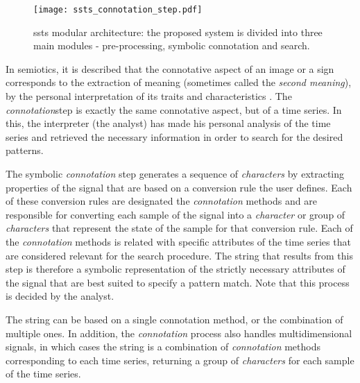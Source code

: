 \begin{figure}
\centering
\texttt{[image: ssts\_connotation\_step.pdf]}
\label{fig:ssts_connotation}
\caption{\gls{ssts} modular architecture: the proposed system is divided into three main modules - pre-processing, symbolic connotation and search.}
\end{figure}

In semiotics, it is described that the connotative aspect of an image or a sign corresponds to the extraction of meaning (sometimes called the \textit{second meaning}), by the personal interpretation of its traits and characteristics \cite{connotation}. The \textit{connotation}step is exactly the same connotative aspect, but of a time series. In this, the interpreter (the analyst) has made his personal analysis of the time series and retrieved the necessary information in order to search for the desired patterns. 
\par
The symbolic \textit{connotation} step generates a sequence of \textit{characters} by extracting properties of the signal that are based on a conversion rule the user defines. Each of these conversion rules are designated the \textit{connotation} methods and are responsible for converting each sample of the signal into a \textit{character} or group of \textit{characters} that represent the state of the sample for that conversion rule. Each of the \textit{connotation} methods is related with specific attributes of the time series that are considered relevant for the search procedure. The string that results from this step is therefore a symbolic representation of the strictly necessary attributes of the signal that are best suited to specify a pattern match. Note that this process is decided by the analyst.
\par
The string can be based on a single connotation method, or the combination of multiple ones. In addition, the \textit{connotation} process also handles multidimensional signals, in which cases the string is a combination of \textit{connotation} methods corresponding to each time series, returning a group of \textit{characters} for each sample of the time series.
\par
